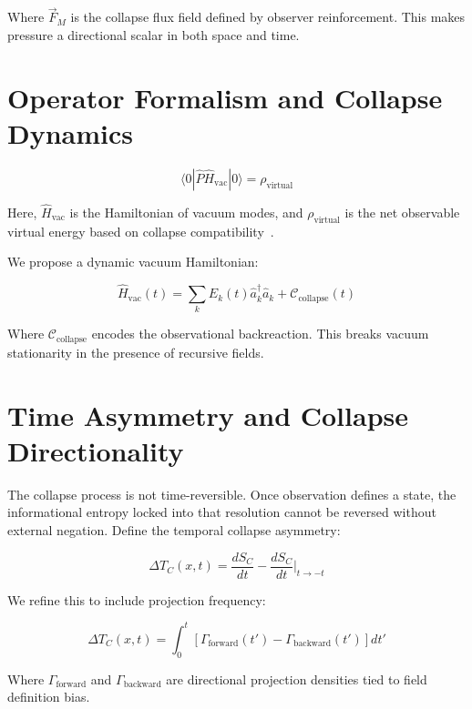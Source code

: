 Where $\vec{F}_M$ is the collapse flux field defined by observer reinforcement. This makes pressure a directional scalar in both space and time.

\section{Operator Formalism and Collapse Dynamics}

\begin{equation}
\langle 0 | \hat{P} \hat{H}_{\text{vac}} | 0 \rangle = \rho_{\text{virtual}}
\end{equation}

Here, $\hat{H}_{\text{vac}}$ is the Hamiltonian of vacuum modes, and $\rho_{\text{virtual}}$ is the net observable virtual energy based on collapse compatibility~\cite{fewster_measurement_qft}.

We propose a dynamic vacuum Hamiltonian:

\begin{equation}
\hat{H}_{\text{vac}}(t) = \sum_{k} E_k(t) \hat{a}^\dagger_k \hat{a}_k + \mathcal{C}_{\text{collapse}}(t)
\end{equation}

Where $\mathcal{C}_{\text{collapse}}$ encodes the observational backreaction. This breaks vacuum stationarity in the presence of recursive fields.

\section{Time Asymmetry and Collapse Directionality}

The collapse process is not time-reversible. Once observation defines a state, the informational entropy locked into that resolution cannot be reversed without external negation. Define the temporal collapse asymmetry:

\begin{equation}
\Delta T_C(x,t) = \frac{dS_C}{dt} - \frac{dS_C}{dt}\bigg|_{t \to -t}
\end{equation}

We refine this to include projection frequency:

\begin{equation}
\Delta T_C(x,t) = \int_0^t \left[ \Gamma_{\text{forward}}(t') - \Gamma_{\text{backward}}(t') \right] dt'
\end{equation}

Where $\Gamma_{\text{forward}}$ and $\Gamma_{\text{backward}}$ are directional projection densities tied to field definition bias.

